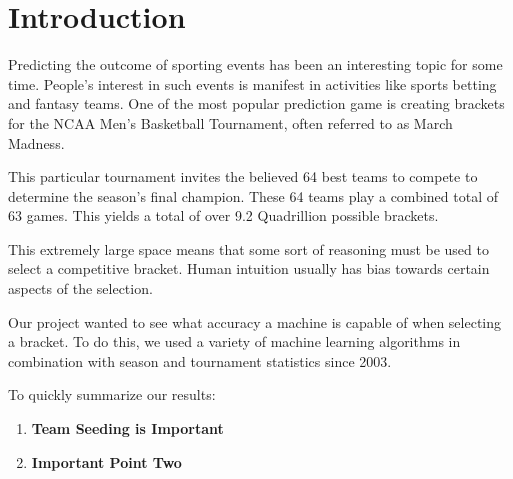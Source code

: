 \section{Introduction}

Predicting the outcome of sporting events has been an interesting topic for some time.
People's interest in such events is manifest in activities like sports betting and fantasy teams.
One of the most popular prediction game is creating brackets for the NCAA Men's Basketball Tournament, often referred to as March Madness.

This particular tournament invites the believed 64 best teams to compete to determine the season's final champion.
These 64 teams play a combined total of 63 games.
This yields a total of over 9.2 Quadrillion possible brackets.

This extremely large space means that some sort of reasoning must be used to select a competitive bracket.
Human intuition usually has bias towards certain aspects of the selection.

Our project wanted to see what accuracy a machine is capable of when selecting a bracket.
To do this, we used a variety  of machine learning algorithms in combination with season and tournament statistics since 2003.

To quickly summarize our results:
\begin{enumerate}
	\item \textbf{Team Seeding is Important}
	\item \textbf{Important Point Two}
\end{enumerate}